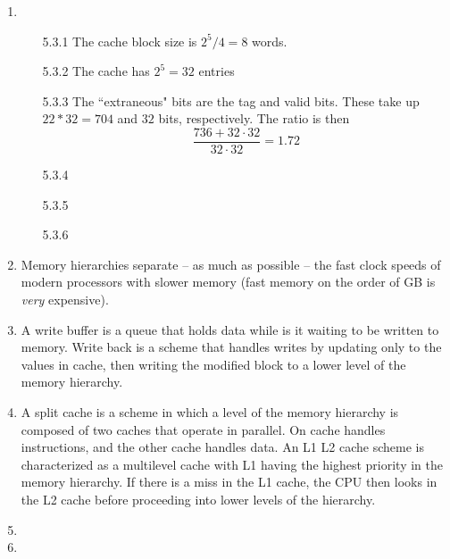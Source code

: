 \documentclass{3330hw}
\begin{document}
\maketitle

\begin{enumerate}

\item
\begin{enumerate}
	\item [5.3.1] The cache block size is $2^{5}/4 = 8$ words.
	\item [5.3.2] The cache has $2^{\text{5}} = 32$ entries
	\item [5.3.3] The ``extraneous" bits are the tag and valid bits. These take up $22*32 = 704$ and $32$ bits, respectively. The ratio is then 
	\[
		\frac{736 + 32\cdot32}{32\cdot32} = 1.72
	\]
	\item [5.3.4]
	\item [5.3.5]
	\item [5.3.6]
\end{enumerate}

\item Memory hierarchies separate -- as much as possible -- the fast clock speeds of modern processors with slower memory (fast memory on the order of GB is \textit{very} expensive).

\item A write buffer is a queue that holds data while is it waiting to be written to memory. Write back is a scheme that handles writes by updating only to the values in cache, then writing the modified block to a lower level of the memory hierarchy.

\item A split cache is a scheme in which a level of the memory hierarchy is composed of two caches that operate in parallel. On cache handles instructions, and the other cache handles data. An L1 L2 cache scheme is characterized as a multilevel cache with L1 having the highest priority in the memory hierarchy. If there is a miss in the L1 cache, the CPU then looks in the L2 cache before proceeding into lower levels of the hierarchy.

\item

\item 



\end{enumerate}
\end{document}
